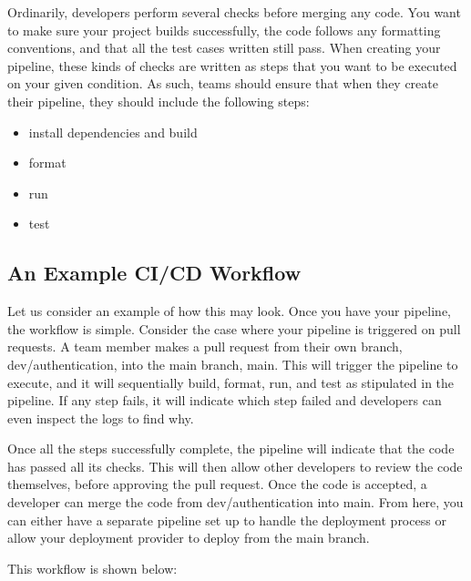 \documentclass[letterpaper,10pt,english]{jupyterBook}
\begin{document}
\sphinxAtStartPar
Ordinarily, developers perform several checks before merging any code.
You want to make sure your project builds successfully, the code follows
any formatting conventions, and that all the test cases written still
pass. When creating your pipeline, these kinds of checks are written as
steps that you want to be executed on your given condition. As such,
teams should ensure that when they create their pipeline, they should
include the following steps:
\begin{itemize}
\item {} 
\sphinxAtStartPar
install dependencies and build

\item {} 
\sphinxAtStartPar
format

\item {} 
\sphinxAtStartPar
run

\item {} 
\sphinxAtStartPar
test

\end{itemize}


\subsection{An Example CI/CD Workflow}
\label{\detokenize{chapter_11/devops:an-example-ci-cd-workflow}}
\sphinxAtStartPar
Let us consider an example of how this may look. Once you have your
pipeline, the workflow is simple. Consider the case where your pipeline
is triggered on pull requests. A team member makes a pull request from
their own branch, dev/authentication, into the main branch, main. This
will trigger the pipeline to execute, and it will sequentially build,
format, run, and test as stipulated in the pipeline. If any step fails,
it will indicate which step failed and developers can even inspect the
logs to find why.

\sphinxAtStartPar
Once all the steps successfully complete, the pipeline will indicate
that the code has passed all its checks. This will then allow other
developers to review the code themselves, before approving the pull
request. Once the code is accepted, a developer can merge the code from
dev/authentication into main. From here, you can either have a separate
pipeline set up to handle the deployment process or allow your
deployment provider to deploy from the main branch.

\sphinxAtStartPar
This workflow is shown below:

\sphinxAtStartPar
{}
\end{document}
